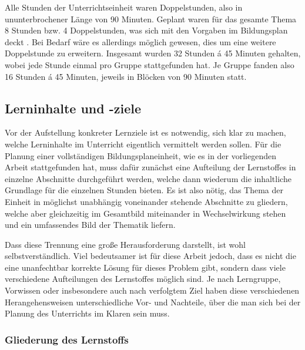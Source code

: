 Alle Stunden der Unterrichtseinheit waren Doppelstunden, also in ununterbrochener Länge von 90 Minuten.
Geplant waren für das gesamte Thema 8 Stunden bzw. 4 Doppelstunden, was sich mit den Vorgaben im Bildungsplan deckt \cite[BPE~19]{bildungsplan-tg-informatik}.
Bei Bedarf wäre es allerdings möglich gewesen, dies um eine weitere Doppelstunde zu erweitern.
Insgesamt wurden 32 Stunden \'a 45 Minuten gehalten, wobei jede Stunde einmal pro Gruppe stattgefunden hat.
Je Gruppe fanden also 16 Stunden \'a 45 Minuten, jeweils in Blöcken von 90 Minuten statt.


\subsection{Lerninhalte und -ziele}
\label{subsec:lernziele}

Vor der Aufstellung konkreter Lernziele ist es notwendig, sich klar zu machen, welche Lerninhalte im Unterricht eigentlich vermittelt werden sollen.
Für die Planung einer vollständigen Bildungsplaneinheit, wie es in der vorliegenden Arbeit stattgefunden hat, muss dafür zunächst eine Aufteilung der Lernstoffes in einzelne Abschnitte durchgeführt werden, welche dann wiederum die inhaltliche Grundlage für die einzelnen Stunden bieten.
Es ist also nötig, das Thema der Einheit in möglichst unabhängig voneinander stehende Abschnitte zu gliedern, welche aber gleichzeitig im Gesamtbild miteinander in Wechselwirkung stehen und ein umfassendes Bild der Thematik liefern.

Dass diese Trennung eine große Herausforderung darstellt, ist wohl selbstverständlich.
Viel bedeutsamer ist für diese Arbeit jedoch, dass es nicht die eine unanfechtbar korrekte Lösung für dieses Problem gibt, sondern dass viele verschiedene Aufteilungen des Lernstoffes möglich sind.
Je nach Lerngruppe, Vorwissen oder insbesondere auch nach verfolgtem Ziel haben diese verschiedenen Herangehensweisen unterschiedliche Vor- und Nachteile, über die man sich bei der Planung des Unterrichts im Klaren sein muss.


\subsubsection{Gliederung des Lernstoffs}
\label{subsubsec:lernstoff-gliederung}

